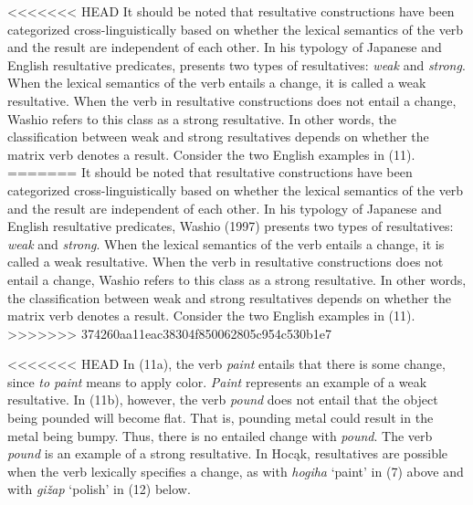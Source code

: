 \documentclass[output=paper]{LSP/langsci}
\begin{document}
\begin{exe}
\begin{exe}
{\end{exe}

<<<<<<< HEAD
It should be noted that resultative constructions have been categorized cross-linguistically based on whether the lexical semantics of the verb and the result are independent of each other. In his typology of Japanese and English resultative predicates, \citet{Washio1997} presents two types of resultatives: \textit{weak} and \textit{strong}. When the lexical semantics of the verb entails a change, it is called a weak resultative. When the verb in resultative constructions does not entail a change, Washio refers to this class as a strong resultative. In other words, the classification between weak and strong resultatives depends on whether the matrix verb denotes a result. Consider the two English examples in (11).
=======
It should be noted that resultative constructions have been categorized cross-linguistically based on whether the lexical semantics of the verb and the result are independent of each other. In his typology of Japanese and English resultative predicates, Washio (1997) presents two types of resultatives: \textit{weak} and \textit{strong}. When the lexical semantics of the verb entails a change, it is called a weak resultative. When the verb in resultative constructions does not entail a change, Washio refers to this class as a strong resultative. In other words, the classification between weak and strong resultatives depends on whether the matrix verb denotes a result. Consider the two English examples in (11).
>>>>>>> 374260aa11eac38304f850062805c954c530b1e7

\begin{exe}
\ex
\begin{xlist}



\end{xlist}
\end{exe}

<<<<<<< HEAD
In (11a), the verb \textit{paint} entails that there is some change, since \textit{to paint} means to apply color. \textit{Paint} represents an example of a weak resultative. In (11b), however, the verb \textit{pound} does not entail that the object being pounded will become flat. That is, pounding metal could result in the metal being bumpy. Thus, there is no entailed change with \textit{pound}. The verb \textit{pound} is an example of a strong resultative. In Hocąk, resultatives are possible when the verb lexically specifies a change, as with \textit{hogiha} `paint' in (7) above and with \textit{gižap} `polish' in (12) below.


\end{exe}
\end{document}
